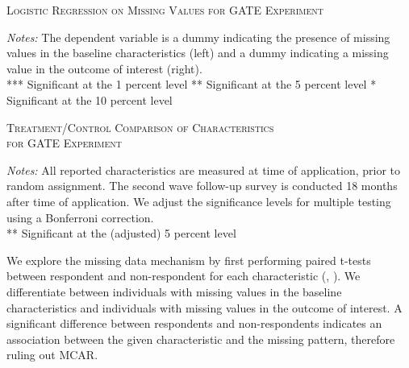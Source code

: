 \begin{table}[t!]
\centering
\caption{\textsc{Logistic Regression on Missing Values for GATE Experiment}}
\begin{adjustbox}{width=\textwidth,totalheight=\textheight,keepaspectratio}

\end{adjustbox}


\label{tab:table_logistic}
\medskip
\raggedright
\footnotesize
\textit{Notes:} The dependent variable is a dummy indicating the presence of missing values in the baseline characteristics (left) and a dummy indicating a missing value in the outcome of interest (right). \\
*** Significant at the 1 percent level ** Significant at the 5 percent level * Significant at the 10 percent level
\end{table}

\begin{table}[t!]
\centering
\caption{\textsc{Treatment/Control Comparison of Characteristics \\ for GATE Experiment}}
\begin{adjustbox}{width=\textwidth, totalheight=\textheight, keepaspectratio}

\end{adjustbox}


\label{tab:table_integrity}
\medskip
\raggedright
\footnotesize
\textit{Notes:} All reported characteristics are measured at time of application, prior to random assignment. The second wave follow-up survey is conducted 18 months after time of application. We adjust the significance levels for multiple testing using a Bonferroni correction. \\
** Significant at the (adjusted) 5 percent level
\end{table}

We explore the missing data mechanism by first performing paired t-tests between respondent and non-respondent for each characteristic (\cite{acock2005}, \cite{huisman1998}). We differentiate between individuals with missing values in the baseline characteristics and individuals with missing values in the outcome of interest. A significant difference between respondents and non-respondents indicates an association between the given characteristic and the missing pattern, therefore ruling out \ac{MCAR}.

